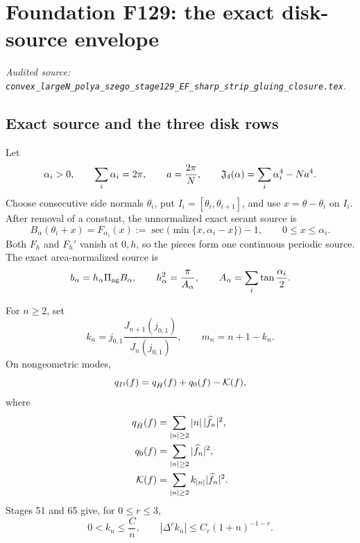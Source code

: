 \begingroup
\renewcommand{\qD}{q_D}
\section{Foundation F129: the exact disk-source envelope}
\label{module:F129}
\noindent\textit{Audited source: \nolinkurl{convex_largeN_polya_szego_stage129_EF_sharp_strip_gluing_closure.tex}.}
\subsection{Exact source and the three disk rows}

Let
\begin{equation}\label{F129:eq:fan}
 \alpha_i>0,\qquad \sum_i\alpha_i=2\pi,\qquad
 a=\frac{2\pi}{N},\qquad
 \mathfrak J_4(\alpha)=\sum_i\alpha_i^4-Na^4.
\end{equation}
Choose consecutive side normals \(\theta_i\), put
\(I_i=[\theta_i,\theta_{i+1}]\), and use \(x=\theta-\theta_i\) on
\(I_i\).  After removal of a constant, the unnormalized exact secant source
is
\begin{equation}\label{F129:eq:B}
 B_\alpha(\theta_i+x)
 =F_{\alpha_i}(x)
 :=\sec\bigl(\min\{x,\alpha_i-x\}\bigr)-1,
 \qquad 0\le x\le\alpha_i.
\end{equation}
Both \(F_h\) and \(F_h'\) vanish at \(0,h\), so the pieces form one
continuous periodic source.  The exact area-normalized source is
\begin{equation}\label{F129:eq:b}
 b_\alpha=h_\alpha\Pi_{\rm ng} B_\alpha,\qquad
 h_\alpha^2=\frac{\pi}{A_\alpha},\qquad
 A_\alpha=\sum_i\tan\frac{\alpha_i}{2}.
\end{equation}

For \(n\ge2\), set
\begin{equation}\label{F129:eq:symbols}
 k_n=j_{0,1}\frac{J_{n+1}(j_{0,1})}{J_n(j_{0,1})},
 \qquad m_n=n+1-k_n.
\end{equation}
On nongeometric modes,
\begin{equation}\label{F129:eq:split}
 \qD(f)=\qdot(f)+\qzero(f)-\kform(f),
\end{equation}
where
\begin{align}
 q_{\dot H}(f)&=\sum_{|n|\ge2}|n|\,|\widehat f_n|^2,\label{F129:eq:qdot}\\
 q_0(f)&=\sum_{|n|\ge2}|\widehat f_n|^2,\label{F129:eq:qzero}\\
 \mathcal K(f)&=\sum_{|n|\ge2}k_{|n|}|\widehat f_n|^2.\label{F129:eq:kform}
\end{align}
Stages 51 and 65 give, for \(0\le r\le3\),
\begin{equation}\label{F129:eq:k-symbol}
 0<k_n\le\frac Cn,\qquad
 |\Delta^rk_n|\le C_r(1+n)^{-1-r}.
\end{equation}

